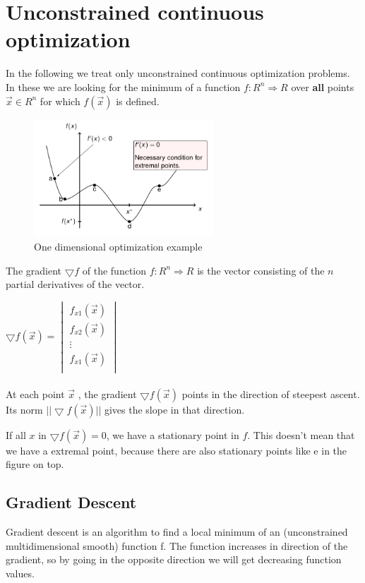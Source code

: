 \section{Unconstrained continuous optimization}

In the following we treat only unconstrained continuous optimization problems. In these we are looking for the minimum of a function $f: R^n \Rightarrow R$ over \textbf{all} points $\overrightarrow{x} \in R^n$ for which $f(\overrightarrow{x})$ is defined.

\begin{figure}[H]
\centering
\includegraphics[width=0.6\textwidth]{figures/one-dimensional-optimization.png}
\caption{One dimensional optimization example}
\end{figure}

The gradient $ \bigtriangledown f$ of the function $f: R^n \Rightarrow R$ is the vector consisting of the $n$ partial derivatives of the vector.

$\bigtriangledown f(\overrightarrow{x}) = \begin{vmatrix}
f_{x1}(\overrightarrow{x}) \\
f_{x2}(\overrightarrow{x})  \\
\vdots \\
f_{x1}(\overrightarrow{x})  \\
\end{vmatrix}$
\\
\\
At each point $\overrightarrow{x}$ , the gradient $\bigtriangledown f(\overrightarrow{x})$ points in the direction of steepest ascent.
Its norm $||\bigtriangledown f(\overrightarrow{x})||$ gives the slope in that direction.

If all $x$ in $\bigtriangledown f(\overrightarrow{x}) = 0$, we have a stationary point in $f$. This doesn't mean that we have a extremal point, because there are also stationary points like e in the figure on top.

\clearpage
\subsection{Gradient Descent}
Gradient descent is an algorithm to find a local minimum of an (unconstrained multidimensional smooth) function f.
The function increases in direction of the gradient, so by going in the opposite direction we will get decreasing function values.

